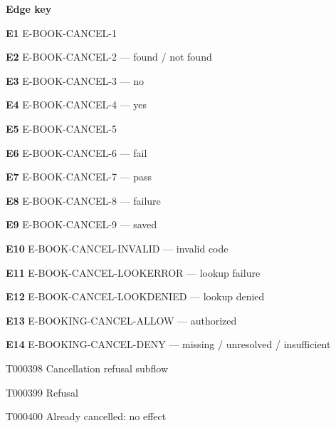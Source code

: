 \documentclass[11pt,a4paper]{article}
\begin{document}
\noindent\textbf{Edge key}\par
\begingroup\small\raggedright\setlength{\parskip}{1pt}
\noindent\textbf{E1} E-BOOK-CANCEL-1\par
\noindent\textbf{E2} E-BOOK-CANCEL-2 --- found / not found\par
\noindent\textbf{E3} E-BOOK-CANCEL-3 --- no\par
\noindent\textbf{E4} E-BOOK-CANCEL-4 --- yes\par
\noindent\textbf{E5} E-BOOK-CANCEL-5\par
\noindent\textbf{E6} E-BOOK-CANCEL-6 --- fail\par
\noindent\textbf{E7} E-BOOK-CANCEL-7 --- pass\par
\noindent\textbf{E8} E-BOOK-CANCEL-8 --- failure\par
\noindent\textbf{E9} E-BOOK-CANCEL-9 --- saved\par
\noindent\textbf{E10} E-BOOK-CANCEL-INVALID --- invalid code\par
\noindent\textbf{E11} E-BOOK-CANCEL-LOOKERROR --- lookup failure\par
\noindent\textbf{E12} E-BOOK-CANCEL-LOOKDENIED --- lookup denied\par
\noindent\textbf{E13} E-BOOKING-CANCEL-ALLOW --- authorized\par
\noindent\textbf{E14} E-BOOKING-CANCEL-DENY --- missing / unresolved / insufficient\par
\endgroup
\clearpage
\begin{atlastext}{T000398}
Cancellation refusal subflow
\end{atlastext}
\begin{atlastext}{T000399}
Refusal
\end{atlastext}
\begin{atlastext}{T000400}
Already cancelled: no effect
\end{atlastext}
\end{document}
